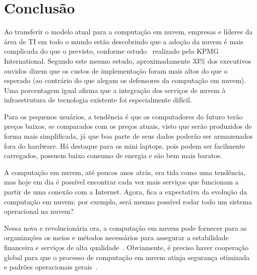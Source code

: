 \section{Conclusão}

Ao transferir o modelo atual para a computação em nuvem, empresas e líderes da área 
de TI em todo o mundo estão descobrindo que a adoção da nuvem é mais complicada do 
que o previsto, conforme estudo~\cite{kmpg-cloud-takes-shape} realizado pela KPMG 
International. Segundo este mesmo estudo, aproximadamente 33\% dos executivos ouvidos
dizem que os custos de implementação foram mais altos do que o esperado (ao contrário
do que alegam os defensores da computação em nuvem). Uma porcentagem igual afirma que
a integração dos serviços de nuvem à infraestrutura de tecnologia existente foi
especialmente difícil.

Para os pequenos usuários, a tendência é que os computadores do futuro terão preços
baixos, se comparados com os preços atuais, visto que serão produzidos de forma mais
simplificada, já que boa parte de seus dados poderão ser armazenados fora do
hardware. Há destaque para os mini laptops, pois podem ser facilmente carregados,
possuem baixo consumo de energia e são bem mais baratos.

A computação em nuvem, até poucos anos atrás, era tida como uma tendência, mas hoje
em dia é possível encontrar cada vez mais serviços que funcionam a partir de uma
conexão com a Internet. Agora, fica a expectativa da evolução da computação em nuvem:
por exemplo, será mesmo possível rodar todo um sistema operacional na nuvem? 

Nessa nova e revolucionária era, a computação em nuvem pode fornecer para as 
organizações os meios e métodos necessários para assegurar a estabilidade financeira 
e serviços de alta qualidade~\cite{cloud-computing-fundamentals}. Obviamente, é 
preciso haver cooperação global para que o processo de computação em nuvem atinja 
segurança otimizada e padrões operacionais gerais~\cite{cloud-computing-fundamentals}. 
